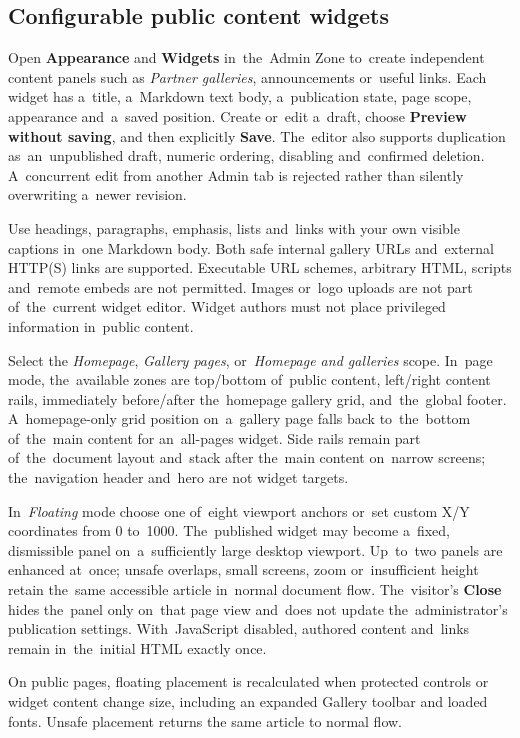 \documentclass[11pt,a4paper]{article}
\newcommand{\ui}[1]{\textbf{#1}}
\begin{document}
\subsection{Configurable public content widgets}

Open \ui{Appearance} and \ui{Widgets} in~the~Admin Zone to~create independent
content panels such as \emph{Partner galleries}, announcements or~useful links.
Each widget has a~title, a~Markdown text body, a~publication state, page scope,
appearance and~a~saved position. Create or~edit a~draft, choose \ui{Preview
without saving}, and then explicitly \ui{Save}. The~editor also supports
duplication as~an~unpublished draft, numeric ordering, disabling and~confirmed
deletion. A~concurrent edit from another Admin tab is rejected rather than
silently overwriting a~newer revision.

Use headings, paragraphs, emphasis, lists and~links with your own visible
captions in~one Markdown body. Both safe internal gallery URLs and~external
HTTP(S) links are supported. Executable URL schemes, arbitrary HTML, scripts
and~remote embeds are not permitted. Images or~logo uploads are not part
of~the~current widget editor. Widget authors must not place privileged
information in~public content.

Select the \emph{Homepage}, \emph{Gallery pages}, or~\emph{Homepage and
galleries} scope. In~page mode, the~available zones are top/bottom of~public
content, left/right content rails, immediately before/after the~homepage gallery
grid, and~the~global footer. A~homepage-only grid position on~a~gallery page
falls back to~the~bottom of~the~main content for an~all-pages widget. Side rails
remain part of~the~document layout and~stack after the~main content on~narrow
screens; the~navigation header and~hero are not widget targets.

In~\emph{Floating} mode choose one of~eight viewport anchors or~set custom X/Y
coordinates from 0 to~1000. The~published widget may become a~fixed, dismissible
panel on~a~sufficiently large desktop viewport. Up~to~two panels are enhanced
at~once; unsafe overlaps, small screens, zoom or~insufficient height retain
the~same accessible article in~normal document flow. The~visitor's \ui{Close}
hides the~panel only on~that page view and~does not update the~administrator's
publication settings. With~JavaScript disabled, authored content and~links
remain in~the~initial HTML exactly once.

On public pages, floating placement is recalculated when protected controls or
widget content change size, including an expanded Gallery toolbar and loaded
fonts. Unsafe placement returns the same article to normal flow.
\end{document}
